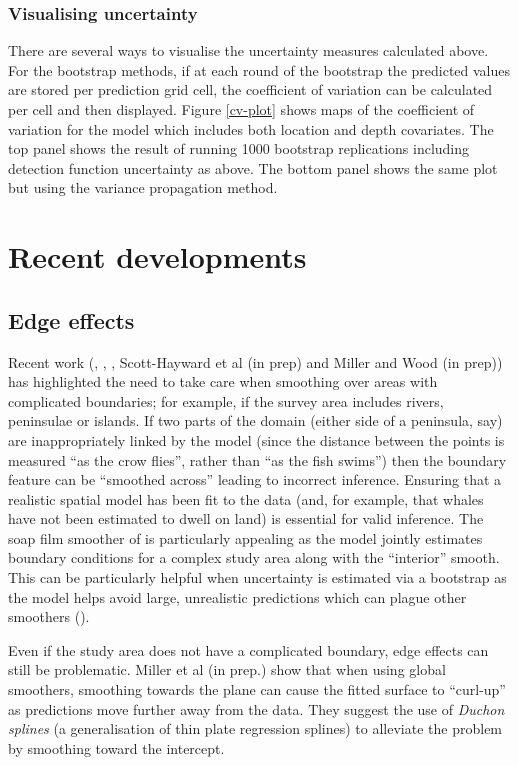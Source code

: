 \documentclass[a4paper,12pt]{article}
\begin{document}
\subsubsection*{Visualising uncertainty}

There are several ways to visualise the uncertainty measures calculated above. For the bootstrap methods, if at each round of the bootstrap the predicted values are stored per prediction grid cell, the coefficient of variation can be calculated per cell and then displayed. Figure \ref{cv-plot} shows maps of the coefficient of variation for the model which includes both location and depth covariates. The top panel shows the result of running 1000 bootstrap replications including detection function uncertainty as above. The bottom panel shows the same plot but using the variance propagation method.


\section*{Recent developments}
\label{s:recentadvances}

\subsection*{Edge effects}
\label{s:leakage}

Recent work (\cite{Ramsay:2002uo}, \cite{Wang:2007tf}, \cite{Wood:2008vo}, Scott-Hayward et al (in prep) and Miller and Wood (in prep)) has highlighted the need to take care when smoothing over areas with complicated boundaries; for example, if the survey area includes rivers, peninsulae or islands. If two parts of the domain (either side of a peninsula, say) are inappropriately linked by the model (since the distance between the points is measured ``as the crow flies'', rather than ``as the fish swims'') then the boundary feature can be ``smoothed across'' leading to incorrect inference. Ensuring that a realistic spatial model has been fit to the data (and, for example, that whales have not been estimated to dwell on land) is essential for valid inference. The soap film smoother of \cite{Wood:2008vo} is particularly appealing as the model jointly estimates boundary conditions for a complex study area along with the ``interior'' smooth. This can be particularly helpful when uncertainty is estimated via a bootstrap as the model helps avoid large, unrealistic predictions which can plague other smoothers (\cite{Bravington:2009vo}).

Even if the study area does not have a complicated boundary, edge effects can still be problematic. Miller et al (in prep.) show that when using global smoothers, smoothing towards the plane can cause the fitted surface to ``curl-up'' as predictions move further away from the data. They suggest the use of \textit{Duchon splines} (a generalisation of thin plate regression splines) to alleviate the problem by smoothing toward the intercept.
\end{document}
